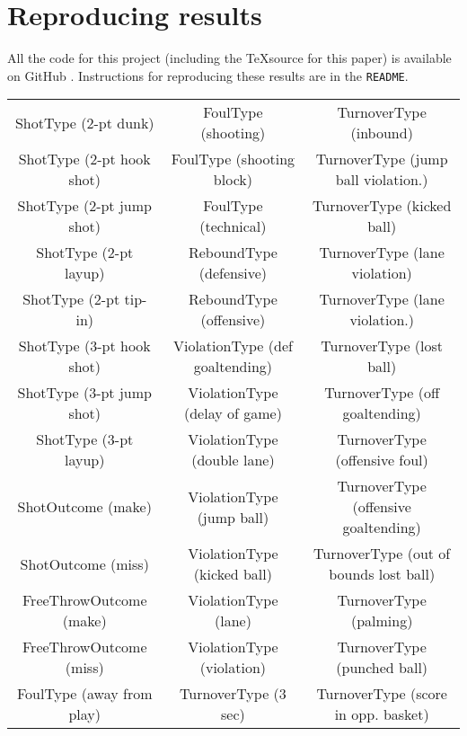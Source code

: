 \FloatBarrier

\appendix

\section{Reproducing results}

All the code for this project (including the \TeX source for this paper) is available on GitHub \cite{stat-comps-github}. Instructions for reproducing these results are in the \texttt{README}.

\begin{table}
	\ttfamily \footnotesize
	\begin{tabular}{ccc}
		ShotType (2-pt dunk)        & FoulType (shooting)                 & TurnoverType (inbound)                 \\
		ShotType (2-pt hook shot)   & FoulType (shooting block)           & TurnoverType (jump ball violation.)    \\
		ShotType (2-pt jump shot)   & FoulType (technical)                & TurnoverType (kicked ball)             \\
		ShotType (2-pt layup)       & ReboundType (defensive)             & TurnoverType (lane violation)          \\
		ShotType (2-pt tip-in)      & ReboundType (offensive)             & TurnoverType (lane violation.)         \\
		ShotType (3-pt hook shot)   & ViolationType (def goaltending)     & TurnoverType (lost ball)               \\
		ShotType (3-pt jump shot)   & ViolationType (delay of game)       & TurnoverType (off goaltending)         \\
		ShotType (3-pt layup)       & ViolationType (double lane)         & TurnoverType (offensive foul)          \\
		ShotOutcome (make)          & ViolationType (jump ball)           & TurnoverType (offensive goaltending)   \\
		ShotOutcome (miss)          & ViolationType (kicked ball)         & TurnoverType (out of bounds lost ball) \\
		FreeThrowOutcome (make)     & ViolationType (lane)                & TurnoverType (palming)                 \\
		FreeThrowOutcome (miss)     & ViolationType (violation)           & TurnoverType (punched ball)            \\
		FoulType (away from play)   & TurnoverType (3 sec)                & TurnoverType (score in opp. basket)    \\

\end{tabular}
\end{table}
